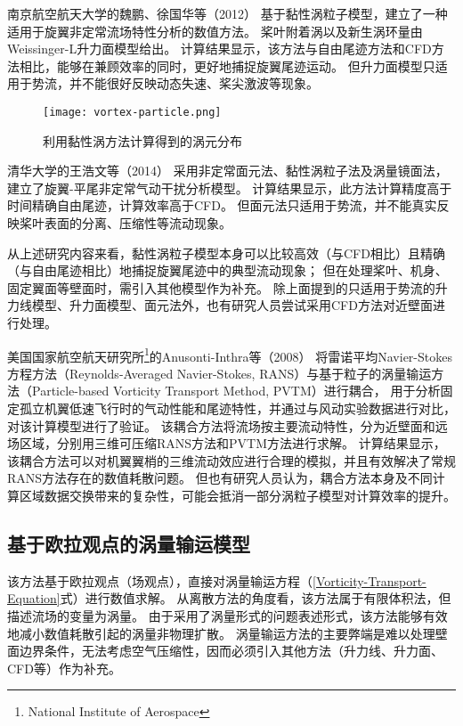 南京航空航天大学的魏鹏、徐国华等（2012）
基于黏性涡粒子模型，建立了一种适用于旋翼非定常流场特性分析的数值方法。
桨叶附着涡以及新生涡环量由Weissinger-L升力面模型给出。
计算结果显示，该方法与自由尾迹方法和CFD方法相比，能够在兼顾效率的同时，更好地捕捉旋翼尾迹运动。
但升力面模型只适用于势流，并不能很好反映动态失速、桨尖激波等现象。
\begin{figure}[t!]
    \centering
    \texttt{[image: vortex-particle.png]}
    \caption{利用黏性涡方法计算得到的涡元分布}\label{vortex-particle}
\end{figure}

清华大学的王浩文等（2014）
采用非定常面元法、黏性涡粒子法及涡量镜面法，建立了旋翼-平尾非定常气动干扰分析模型。
计算结果显示，此方法计算精度高于时间精确自由尾迹，计算效率高于CFD。
但面元法只适用于势流，并不能真实反映桨叶表面的分离、压缩性等流动现象。

从上述研究内容来看，黏性涡粒子模型本身可以比较高效（与CFD相比）且精确（与自由尾迹相比）地捕捉旋翼尾迹中的典型流动现象；
但在处理桨叶、机身、固定翼面等壁面时，需引入其他模型作为补充。
除上面提到的只适用于势流的升力线模型、升力面模型、面元法外，也有研究人员尝试采用CFD方法对近壁面进行处理。

美国国家航空航天研究所\footnote{National Institute of Aerospace}的Anusonti-Inthra等（2008）
将雷诺平均Navier-Stokes方程方法（Reynolds-Averaged Navier-Stokes, RANS）与基于粒子的涡量输运方法（Particle-based Vorticity Transport Method, PVTM）进行耦合，
用于分析固定孤立机翼低速飞行时的气动性能和尾迹特性，并通过与风动实验数据进行对比，对该计算模型进行了验证。
该耦合方法将流场按主要流动特性，分为近壁面和远场区域，分别用三维可压缩RANS方法和PVTM方法进行求解。
计算结果显示，该耦合方法可以对机翼翼梢的三维流动效应进行合理的模拟，并且有效解决了常规RANS方法存在的数值耗散问题。
但也有研究人员认为，耦合方法本身及不同计算区域数据交换带来的复杂性，可能会抵消一部分涡粒子模型对计算效率的提升。

\subsection{基于欧拉观点的涡量输运模型}\label{Vorticity-Transport-Model}
该方法基于欧拉观点（场观点），直接对涡量输运方程（\ref{Vorticity-Transport-Equation}式）进行数值求解。
从离散方法的角度看，该方法属于有限体积法，但描述流场的变量为涡量。
由于采用了涡量形式的问题表述形式，该方法能够有效地减小数值耗散引起的涡量非物理扩散。
涡量输运方法的主要弊端是难以处理壁面边界条件，无法考虑空气压缩性，因而必须引入其他方法（升力线、升力面、CFD等）作为补充。

